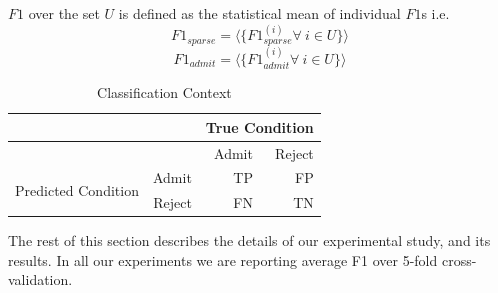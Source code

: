 \documentclass{sig-alternate-05-2015}
\begin{document}
$F1$ over the set $U$ is defined as the statistical mean of individual $F1$s i.e.
$$F1_{sparse} = \langle \{ F1^{(i)}_{sparse} \forall~i \in U \} \rangle $$
$$F1_{admit} = \langle \{ F1^{(i)}_{admit} \forall~i \in U \} \rangle $$

\begin{table}[]
\centering
\caption{Classification Context}
\label{tab:classification-context}
\begin{tabular}{|l|r|r|r|}
\hline
                  &  & \multicolumn{2}{r|}{True Condition} \\ \hline
                  &  &  Admit         & Reject          \\ \hline
\multirow{2}{*}{Predicted Condition} & Admit &  TP         & FP          \\ \cline{2-4} 
                  & Reject & FN          & TN          \\ \hline
\end{tabular}
\end{table}

The rest of this section describes the details of our experimental study, and its results. In all our experiments we are reporting average F1 over 5-fold cross-validation.
\end{document}
